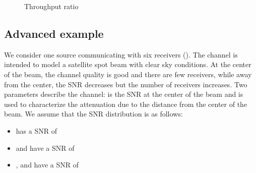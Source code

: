 \documentclass[conference, letterpaper]{IEEEtran}
\begin{document}
\begin{figure}[!ht]
\centering
{}\hfil
{}

\hfil
{}

\hfil
{}

\caption{Throughput ratio}
\label{gain2D}
\end{figure} 


\subsection{Advanced example}

We consider one source communicating with six receivers (). The channel is intended to model a satellite spot beam with clear sky conditions. At the center of the beam, the channel quality is good and there are few receivers, while away from the center, the SNR decreases but the number of receivers increases. Two parameters describe the channel:  is the SNR at the center of the beam and  is used to characterize the attenuation due to the distance from the center of the beam. We assume that the SNR distribution is as follows:   
\begin{itemize}
\item  has a SNR of 
\item  and  have a SNR of 
\item ,  and  have a SNR of 
\end{itemize}
\end{document}
